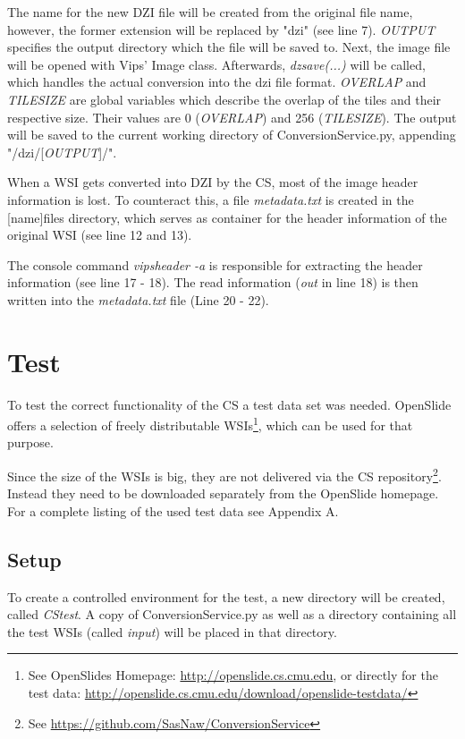 The name for the new DZI file will be created from the original file name, however, the former extension will be replaced by "dzi" (see line 7). \emph{OUTPUT} specifies the output directory which the file will be saved to. Next, the image file will be opened with Vips' Image class. Afterwards, \emph{dzsave(...)} will be called, which handles the actual conversion into the dzi file format. \emph{OVERLAP} and \emph{TILESIZE} are global variables which describe the overlap of the tiles and their respective size. Their values are 0 (\emph{OVERLAP}) and 256 (\emph{TILESIZE}). The output will be saved to the current working directory of ConversionService.py, appending "/dzi/[\emph{OUTPUT}]/".

When a WSI gets converted into DZI by the CS, most of the image header information is lost. To counteract this, a file \emph{metadata.txt} is created in the [name]{\textunderscore}files directory, which serves as container for the header information of the original WSI (see line 12 and 13).

The console command \emph{vipsheader -a} is responsible for extracting the header information (see line 17 - 18). The read information (\emph{out} in line 18) is then written into the \emph{metadata.txt} file (Line 20 - 22).


\section{Test}
\label{sec3_test}
To test the correct functionality of the CS a test data set was needed. OpenSlide offers a selection of freely distributable WSIs\footnote{See OpenSlides Homepage: \url{http://openslide.cs.cmu.edu}, or directly for the test data: \url{http://openslide.cs.cmu.edu/download/openslide-testdata/}}, which can be used for that purpose.

Since the size of the WSIs is big, they are not delivered via the CS repository\footnote{See \url{https://github.com/SasNaw/ConversionService}}. Instead they need to be downloaded separately from the OpenSlide homepage. For a complete listing of the used test data see Appendix A.


\subsection{Setup}

To create a controlled environment for the test, a new directory will be created, called \emph{CS{\textunderscore}test}. A copy of ConversionService.py as well as a directory containing all the test WSIs (called \emph{input}) will be placed in that directory.

